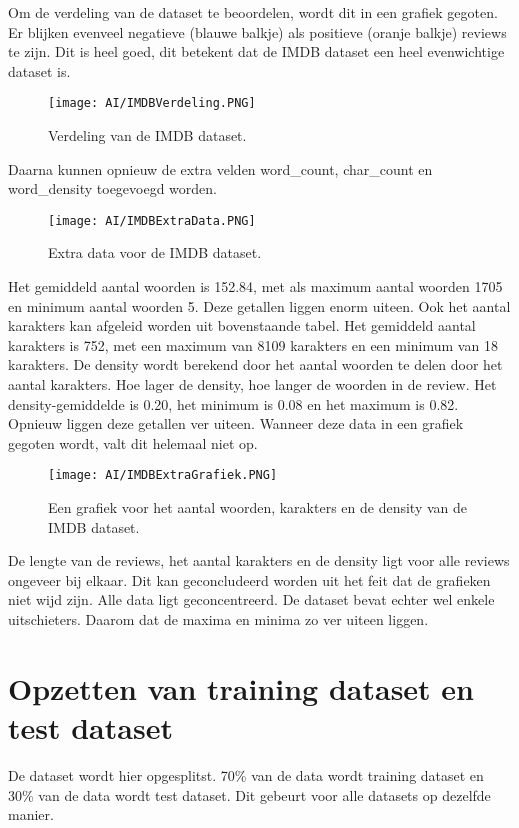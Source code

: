 Om de verdeling van de dataset te beoordelen, wordt dit in een grafiek gegoten. Er blijken evenveel negatieve (blauwe balkje) als positieve (oranje balkje) reviews te zijn. Dit is heel goed, dit betekent dat de IMDB dataset een heel evenwichtige dataset is. 

\begin{figure}[!htbp]
    \texttt{[image: AI/IMDBVerdeling.PNG]}
    \caption{\label{imdbgrafiek}Verdeling van de IMDB dataset.}
\end{figure}
\FloatBarrier

Daarna kunnen opnieuw de extra velden word\_count, char\_count en word\_density toegevoegd worden. 

\begin{figure}[!htbp]
    \texttt{[image: AI/IMDBExtraData.PNG]}
    \caption{\label{imdbextradata}Extra data voor de IMDB dataset.}
\end{figure}
\FloatBarrier

Het gemiddeld aantal woorden is 152.84, met als maximum aantal woorden 1705 en minimum aantal woorden 5. Deze getallen liggen enorm uiteen. Ook het aantal karakters kan afgeleid worden uit bovenstaande tabel. Het gemiddeld aantal karakters is 752, met een maximum van 8109 karakters en een minimum van 18 karakters. De density wordt berekend door het aantal woorden te delen door het aantal karakters. Hoe lager de density, hoe langer de woorden in de review. Het density-gemiddelde is 0.20, het minimum is 0.08 en het maximum is 0.82. Opnieuw liggen deze getallen ver uiteen. Wanneer deze data in een grafiek gegoten wordt, valt dit helemaal niet op.

\begin{figure}[!htbp]
    \texttt{[image: AI/IMDBExtraGrafiek.PNG]}
    \caption{\label{imdbextragrafiek}Een grafiek voor het aantal woorden, karakters en de density van de IMDB dataset.}
\end{figure}
\FloatBarrier

De lengte van de reviews, het aantal karakters en de density ligt voor alle reviews ongeveer bij elkaar. Dit kan geconcludeerd worden uit het feit dat de grafieken niet wijd zijn. Alle data ligt geconcentreerd. De dataset bevat echter wel enkele uitschieters. Daarom dat de maxima en minima zo ver uiteen liggen. 


\section{Opzetten van training dataset en test dataset}
De dataset wordt hier opgesplitst. 70\% van de data wordt training dataset en 30\% van de data wordt test dataset. Dit gebeurt voor alle datasets op dezelfde manier.

